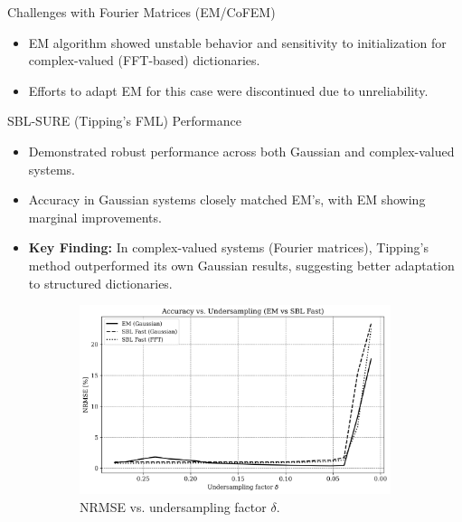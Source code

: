 \documentclass{beamer}
\begin{document}
\begin{frame}{Challenges with Fourier Matrices (EM/CoFEM)}
    \begin{itemize}
        \item EM algorithm showed unstable behavior and sensitivity to initialization for complex-valued (FFT-based) dictionaries. 
        \item Efforts to adapt EM for this case were discontinued due to unreliability. 
    \end{itemize}
\end{frame}

\begin{frame}{SBL-SURE (Tipping's FML) Performance}
    \begin{itemize}
        \item Demonstrated robust performance across both Gaussian and complex-valued systems. 
        \item Accuracy in Gaussian systems closely matched EM's, with EM showing marginal improvements. 
        \item \textbf{Key Finding:} In complex-valued systems (Fourier matrices), Tipping's method outperformed its own Gaussian results, suggesting better adaptation to structured dictionaries. 
    \end{itemize}
    \begin{figure}[h!]
        \centering
        \begin{subfigure}[b]{0.48\textwidth}
            \includegraphics[width=\textwidth]{Figures/accuracy_vs_undersampling_EMvsSB_woEMFFT.png}
            \caption{NRMSE vs. undersampling factor $\delta$. }
        \end{subfigure}
        \hfill
        \begin{subfigure}[b]{0.48\textwidth}

\end{subfigure}
\end{figure}
\end{frame}
\end{document}
